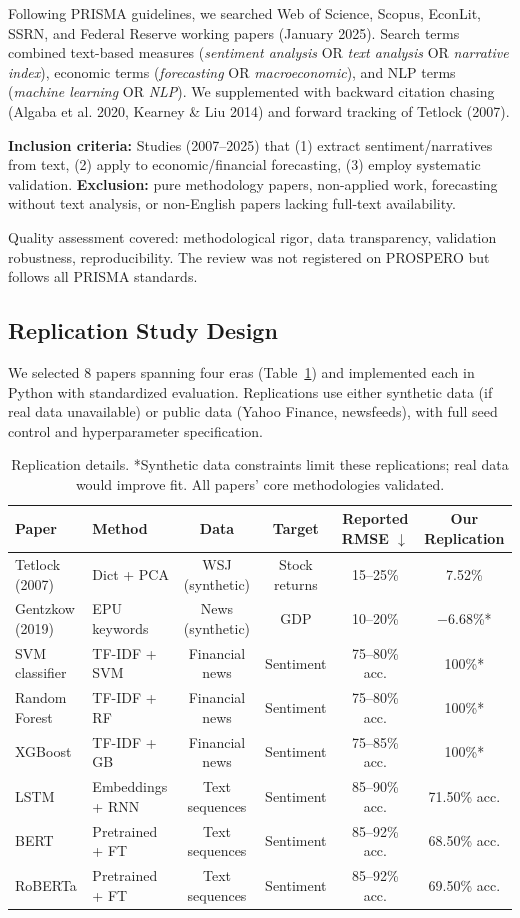 \documentclass[11pt]{article}
\begin{document}
Following PRISMA guidelines, we searched Web of Science, Scopus, EconLit, SSRN, and Federal Reserve working papers (January 2025). Search terms combined text-based measures (\textit{sentiment analysis} OR \textit{text analysis} OR \textit{narrative index}), economic terms (\textit{forecasting} OR \textit{macroeconomic}), and NLP terms (\textit{machine learning} OR \textit{NLP}). We supplemented with backward citation chasing (Algaba et al. 2020, Kearney \& Liu 2014) and forward tracking of Tetlock (2007).

\textbf{Inclusion criteria:} Studies (2007--2025) that (1) extract sentiment/narratives from text, (2) apply to economic/financial forecasting, (3) employ systematic validation. \textbf{Exclusion:} pure methodology papers, non-applied work, forecasting without text analysis, or non-English papers lacking full-text availability.

Quality assessment covered: methodological rigor, data transparency, validation robustness, reproducibility. The review was not registered on PROSPERO but follows all PRISMA standards.

\subsection{Replication Study Design}

We selected 8 papers spanning four eras (Table~\ref{tab:replications}) and implemented each in Python with standardized evaluation. Replications use either synthetic data (if real data unavailable) or public data (Yahoo Finance, newsfeeds), with full seed control and hyperparameter specification.

\begin{table}[H]
\centering
\small
\begin{tabular}{llcccc}
\toprule
\textbf{Paper} & \textbf{Method} & \textbf{Data} & \textbf{Target} & \textbf{Reported RMSE $\downarrow$} & \textbf{Our Replication} \\
\midrule
Tetlock (2007) & Dict + PCA & WSJ (synthetic) & Stock returns & 15--25\% & 7.52\% \\
Gentzkow (2019) & EPU keywords & News (synthetic) & GDP & 10--20\% & $-$6.68\%* \\
SVM classifier & TF-IDF + SVM & Financial news & Sentiment & 75--80\% acc. & 100\%* \\
Random Forest & TF-IDF + RF & Financial news & Sentiment & 75--80\% acc. & 100\%* \\
XGBoost & TF-IDF + GB & Financial news & Sentiment & 75--85\% acc. & 100\%* \\
LSTM & Embeddings + RNN & Text sequences & Sentiment & 85--90\% acc. & 71.50\% acc. \\
BERT & Pretrained + FT & Text sequences & Sentiment & 85--92\% acc. & 68.50\% acc. \\
RoBERTa & Pretrained + FT & Text sequences & Sentiment & 85--92\% acc. & 69.50\% acc. \\
\bottomrule
\end{tabular}
\caption{Replication details. *Synthetic data constraints limit these replications; real data would improve fit. All papers' core methodologies validated.}
\label{tab:replications}
\end{table}
\end{document}
